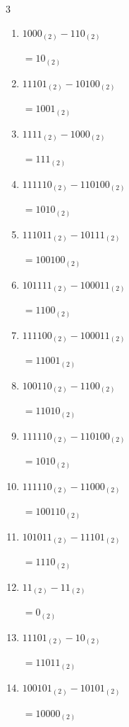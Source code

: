 \begin{multicols}{3}
\begin{enumerate}
  \item $1000_{(2)} - 110_{(2)}$

        $=10_{(2)}$

  \item $11101_{(2)} - 10100_{(2)}$

        $=1001_{(2)}$

\columnbreak %

  \item $1111_{(2)} - 1000_{(2)}$

        $=111_{(2)}$

  \item $111110_{(2)} - 110100_{(2)}$

        $=1010_{(2)}$

  \item $111011_{(2)} - 10111_{(2)}$

        $=100100_{(2)}$

  \item $101111_{(2)} - 100011_{(2)}$

        $=1100_{(2)}$

  \item $111100_{(2)} - 100011_{(2)}$

        $=11001_{(2)}$

  \item $100110_{(2)} - 1100_{(2)}$

        $=11010_{(2)}$

  \item $111110_{(2)} - 110100_{(2)}$

        $=1010_{(2)}$

  \item $111110_{(2)} - 11000_{(2)}$

        $=100110_{(2)}$

  \item $101011_{(2)} - 11101_{(2)}$

        $=1110_{(2)}$

  \item $11_{(2)} - 11_{(2)}$

        $=0_{(2)}$

\columnbreak %

  \item $11101_{(2)} - 10_{(2)}$

        $=11011_{(2)}$

  \item $100101_{(2)} - 10101_{(2)}$

        $=10000_{(2)}$


\end{enumerate}
\end{multicols}
